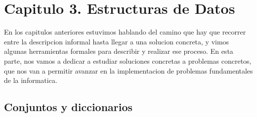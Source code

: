 \documentclass[10pt,a4paper]{article}
\begin{document}
\section{Capitulo 3. Estructuras de Datos}

En los capitulos anteriores estuvimos hablando del camino que hay que recorrer entre la descripcion informal hasta llegar a una solucion concreta, y vimos algunas herramientas formales para describir y realizar ese proceso. En esta parte, nos vamos a dedicar a estudiar soluciones concretas a problemas concretos, que nos van a permitir avanzar en la implementacion de problemas fundamentales de la informatica.

\subsection{Conjuntos y diccionarios}
\end{document}
